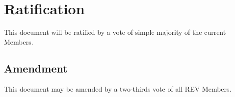 \section{Ratification}
\label{ratification}

This document will be ratified by a vote of simple majority of the current Members.

\subsection{Amendment}
\label{ratification:amendment}

This document may be amended by a two-thirds vote of all REV Members.